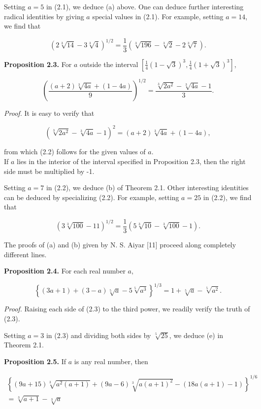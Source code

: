 \documentclass[11pt,letterpaper]{article}
\begin{document}
Setting $a=5$ in (2.1), we deduce (a) above. One can deduce further interesting radical identities by giving $a$ special values in (2.1). For example, setting $a=14$, we find that

\[
(2 \sqrt[3]{14}-3 \sqrt[3]{4})^{1 / 2}=\frac{1}{3}(\sqrt[3]{196}-\sqrt[3]{2}-2 \sqrt[3]{7}) .
\]

\noindent\textbf{Proposition 2.3.} For $a$ outside the interval $\left[\frac{1}{4}(1-\sqrt{3})^{3}, \frac{1}{4}(1+\sqrt{3})^{3}\right]$,


\begin{equation*}
\left(\frac{(a+2) \sqrt[3]{4 a}+(1-4 a)}{9}\right)^{1 / 2}=\frac{\sqrt[3]{2 a^{2}}-\sqrt[3]{4 a}-1}{3} . \tag{2.2}\label{eq:2.2}
\end{equation*}


\noindent\textit{Proof.} It is easy to verify that

\[
\left(\sqrt[3]{2 a^{2}}-\sqrt[3]{4 a}-1\right)^{2}=(a+2) \sqrt[3]{4 a}+(1-4 a),
\]

from which (2.2) follows for the given values of $a$.\\
If $a$ lies in the interior of the interval specified in Proposition 2.3, then the right side must be multiplied by -1.

Setting $a=7$ in (2.2), we deduce (b) of Theorem 2.1. Other interesting identities can be deduced by specializing (2.2). For example, setting $a=25$ in (2.2), we find that

\[
(3 \sqrt[3]{100}-11)^{1 / 2}=\frac{1}{3}(5 \sqrt[3]{10}-\sqrt[3]{100}-1) .
\]

The proofs of (a) and (b) given by N. S. Aiyar [11] proceed along completely different lines.

\noindent\textbf{Proposition 2.4.} For each real number $a$,


\begin{equation*}
\left\{(3 a+1)+(3-a) \sqrt[5]{a}-5 \sqrt[5]{a^{3}}\right\}^{1 / 3}=1+\sqrt[5]{a}-\sqrt[5]{a^{2}} . \tag{2.3}\label{eq:2.3}
\end{equation*}


\noindent\textit{Proof.} Raising each side of (2.3) to the third power, we readily verify the truth of (2.3).

Setting $a=3$ in (2.3) and dividing both sides by $\sqrt[5]{25}$, we deduce (e) in Theorem 2.1.

\noindent\textbf{Proposition 2.5.} If $a$ is any real number, then

\[
\begin{array}{r}
\left\{(9 a+15) \sqrt[3]{a^{2}(a+1)}+(9 a-6) \sqrt[3]{a(a+1)^{2}}-(18 a(a+1)-1)\right\}^{1 / 6}  \tag{2.4}\label{eq:2.4}\\
=\sqrt[3]{a+1}-\sqrt[3]{a}
\end{array}
\]
\end{document}
